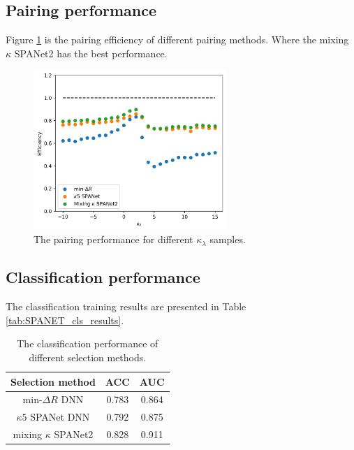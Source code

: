 \documentclass[12pt]{article}
\begin{document}
	\subsection{Pairing performance}%
	\label{sub:pairing_performance}
		Figure \ref{fig:pairing_performance_kappa} is the pairing efficiency of different pairing methods. Where the mixing $\kappa$ SPANet2 has the best performance.
		\begin{figure}[htpb]
			\centering
			\includegraphics[width=0.65\textwidth]{pairing_efficiency_kappa-SPANet2.png}
			\caption{The pairing performance for different $\kappa_\lambda$ samples.}
			\label{fig:pairing_performance_kappa}
		\end{figure}

	\subsection{Classification performance}%
	\label{sub:classification_performance}
		The classification training results are presented in Table \ref{tab:SPANET_cls_results}.
		\begin{table}[htpb]
			\centering
			\caption{The classification performance of different selection methods.}
			\label{tab:classification_results_summary}
			\begin{tabular}{c|cc}
			Selection method          & ACC   & AUC   \\ \hline
			$\text{min-}\Delta R$ DNN & 0.783 & 0.864 \\
			$\kappa 5$ SPANet DNN     & 0.792 & 0.875 \\
			mixing $\kappa$ SPANet2   & 0.828 & 0.911
			\end{tabular}			
		\end{table}

\end{document}
